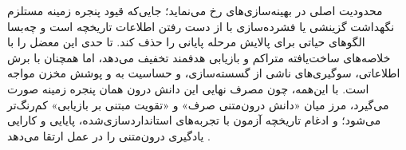 محدودیت اصلی در بهینه‌سازی‌های  رخ می‌نماید؛ جایی‌که قیود پنجره زمینه مستلزم نگهداشت گزینشی یا فشرده‌سازی با از دست رفتن اطلاعات تاریخچه است و چه‌بسا الگوهای حیاتی برای پالایش مرحله پایانی را حذف کند.  تا حدی این معضل را با خلاصه‌های ساخت‌یافته متراکم و بازیابی هدفمند تخفیف می‌دهد، اما همچنان با برش اطلاعاتی، سوگیری‌های ناشی از گسسته‌سازی، و حساسیت به  و پوشش مخزن مواجه است. با این‌همه، چون مصرف نهایی این دانش درون همان پنجره زمینه صورت می‌گیرد، مرز میان «دانش درون‌متنی صرف» و «تقویت مبتنی بر بازیابی» کم‌رنگ‌تر می‌شود؛ و ادغام تاریخچه آزمون با تجربه‌های استانداردسازی‌شده، پایایی و کارایی یادگیری درون‌متنی را در عمل ارتقا می‌دهد \cite{zhang2023usingLLMforHPO, zheng2023GENIUS, chen2023Evoprompting, liu2024LLAMBO, zhang-etal-2024-MLCopilot}.




